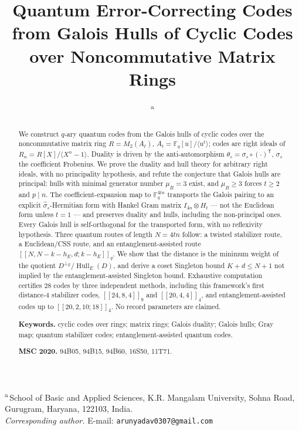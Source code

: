 \documentclass[11pt,a4paper]{article}
\title{Quantum Error-Correcting Codes from Galois Hulls of Cyclic
       Codes over Noncommutative Matrix Rings}
\author{\AUTHORONE\textsuperscript{a}}
\date{}
\makeatletter
\newcommand{\AUTHORONEINST}{School of Basic and Applied Sciences}
\newcommand{\AUTHORONEORG}{K.R. Mangalam University}
\newcommand{\AUTHORONEADDR}{Sohna Road, Gurugram, Haryana, 122103}
\newcommand{\AUTHORONECOUNTRY}{India}
\newcommand{\CORRESPONDINGEMAIL}{arunyadav0307@gmail.com}
\newcommand{\F}{\mathbb F}
\newcommand{\Hull}{\operatorname{Hull}}
\newcommand{\MU}{\mu}
\theoremstyle{plain}
\theoremstyle{definition}
\theoremstyle{remark}
\newcommand{\AFFILIATIONBLOCK}{%
  \begin{center}\small
  \textsuperscript{a}\,\AUTHORONEINST, \AUTHORONEORG,
  \AUTHORONEADDR, \AUTHORONECOUNTRY.\\[2pt]
  \textit{Corresponding author.} E-mail: \texttt{\CORRESPONDINGEMAIL}
  \end{center}}
\makeatother
\begin{document}
\maketitle
\AFFILIATIONBLOCK

\begin{abstract}
We construct $q$-ary quantum codes from the Galois hulls of cyclic codes over
the noncommutative matrix ring $R=M_2(A_t)$,
$A_t=\F_q[u]/\langle u^t\rangle$; codes are right ideals of
$R_n=R[X]/\langle X^n-1\rangle$.  Duality is driven by the anti-automorphism
$\theta_s=\sigma_s\circ(\cdot)^{\mathsf T}$, $\sigma_s$ the coefficient
Frobenius.  We prove the duality and hull theory for arbitrary right ideals,
with no principality hypothesis, and refute the conjecture that Galois hulls
are principal: hulls with minimal generator number $\MU_B=3$ exist, and
$\MU_B\ge3$ forces $t\ge2$ and $p\mid n$.  The coefficient-expansion map to
$\F_q^{4tn}$ transports the Galois pairing to an explicit
$\widehat\sigma_s$-Hermitian form with Hankel Gram matrix
$I_{4n}\otimes H_t$ --- not the Euclidean form unless $t=1$ --- and preserves
duality and hulls, including the non-principal ones.  Every Galois hull is
self-orthogonal for the transported form, with no reflexivity hypothesis.
Three quantum routes of length $N=4tn$ follow: a twisted stabilizer route, a
Euclidean/CSS route, and an entanglement-assisted route
$[[N,N-k-h_E,d;k-h_E]]_q$.  We show that the distance is the minimum weight of
the quotient $D^{\perp_E}/\Hull_E(D)$, and derive a coset Singleton bound
$K+d\le N+1$ not implied by the entanglement-assisted Singleton bound.
Exhaustive computation certifies $28$ codes by three independent methods,
including this framework's first distance-$4$ stabilizer codes,
$[[24,8,4]]_9$ and $[[20,4,4]]_4$, and entanglement-assisted codes up
to $[[20,2,10;18]]_4$.  No record parameters are claimed.

\smallskip
\noindent\textbf{Keywords.} cyclic codes over rings; matrix rings; Galois
duality; Galois hulls; Gray map; quantum stabilizer codes;
entanglement-assisted quantum codes.

\smallskip
\noindent\textbf{MSC 2020.} 94B05, 94B15, 94B60, 16S50, 11T71.
\end{abstract}

\tableofcontents
\bigskip











\end{document}
